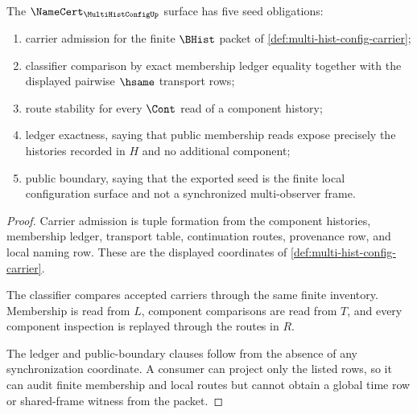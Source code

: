 \begin{theorem}
\label{thm:multi-hist-config-namecert-obligations}
The $\NameCert_{\MultiHistConfigUp}$ surface has five seed obligations:
\begin{enumerate}
\item carrier admission for the finite $\BHist$ packet of \autoref{def:multi-hist-config-carrier};
\item classifier comparison by exact membership ledger equality together with the displayed pairwise $\hsame$ transport rows;
\item route stability for every $\Cont$ read of a component history;
\item ledger exactness, saying that public membership reads expose precisely the histories recorded in $H$ and no additional component;
\item public boundary, saying that the exported seed is the finite local configuration surface and not a synchronized multi-observer frame.
\end{enumerate}
\end{theorem}
\begin{proof}
Carrier admission is tuple formation from the component histories, membership ledger, transport table, continuation routes, provenance row, and local naming row. These are the displayed coordinates of \autoref{def:multi-hist-config-carrier}.

The classifier compares accepted carriers through the same finite inventory. Membership is read from $L$, component comparisons are read from $T$, and every component inspection is replayed through the routes in $R$.

The ledger and public-boundary clauses follow from the absence of any synchronization coordinate. A consumer can project only the listed rows, so it can audit finite membership and local routes but cannot obtain a global time row or shared-frame witness from the packet.
\end{proof}

